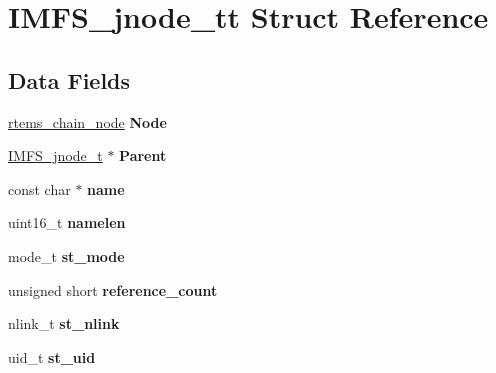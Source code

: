 \hypertarget{structIMFS__jnode__tt}{}\section{I\+M\+F\+S\+\_\+jnode\+\_\+tt Struct Reference}
\label{structIMFS__jnode__tt}
\subsection*{Data Fields}
\begin{DoxyCompactItemize}
\item 
\mbox{\label{structIMFS__jnode__tt_aabce42320963de432862bcf654a67c9c}} 
\mbox{\hyperlink{structChain__Node__struct}{rtems\+\_\+chain\+\_\+node}} {\bfseries Node}
\item 
\mbox{\label{structIMFS__jnode__tt_a088d221526c3d636f96c4a88697979ea}} 
\mbox{\hyperlink{structIMFS__jnode__tt}{I\+M\+F\+S\+\_\+jnode\+\_\+t}} $\ast$ {\bfseries Parent}
\item 
\mbox{\label{structIMFS__jnode__tt_ac921ae2ba54efe105b79e43df3acc699}} 
const char $\ast$ {\bfseries name}
\item 
\mbox{\label{structIMFS__jnode__tt_ad0a9f028c8189dbfe476c72c3c3027e0}} 
uint16\+\_\+t {\bfseries namelen}
\item 
\mbox{\label{structIMFS__jnode__tt_aca37039959a1debef8b4838f0bd990a4}} 
mode\+\_\+t {\bfseries st\+\_\+mode}
\item 
\mbox{\label{structIMFS__jnode__tt_ac0c52b9a01808c99880061363ae97971}} 
unsigned short {\bfseries reference\+\_\+count}
\item 
\mbox{\label{structIMFS__jnode__tt_a24e341235ee22dcc9901533b1fa2a841}} 
nlink\+\_\+t {\bfseries st\+\_\+nlink}
\item 
\mbox{\label{structIMFS__jnode__tt_ab68806736dd0bb7e8eedf0092052449d}} 
uid\+\_\+t {\bfseries st\+\_\+uid}
\item 
\mbox{\label{structIMFS__jnode__tt_a3bdca7a318d4756e8643ba3b03bb2fbe}} 

\end{DoxyCompactItemize}
